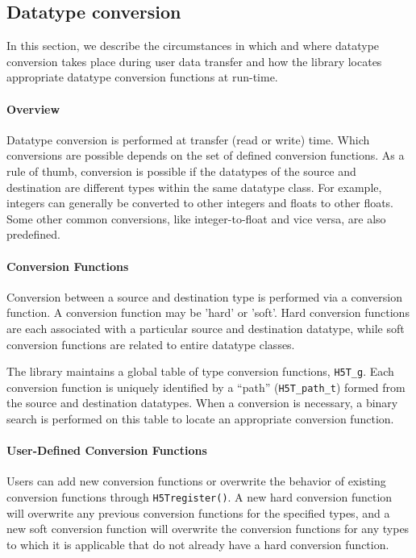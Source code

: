 \subsection{Datatype conversion}\label{sec:dtype-conv}

In this section, we describe the circumstances in which and where datatype conversion takes place during user data transfer and how the library locates appropriate datatype conversion functions at run-time.

\paragraph{Overview} Datatype conversion is performed at transfer (read or write) time. Which conversions are possible depends on the set of defined conversion functions. As a rule of thumb, conversion is possible if the datatypes of the source and destination are different types within the same datatype class. For example, integers can generally be converted to other integers and floats to other floats. Some other common conversions, like integer-to-float and vice versa, are also predefined.

\paragraph{Conversion Functions} Conversion between a source and destination type is performed via a conversion function. A conversion function may be 'hard' or 'soft'. Hard conversion functions are each associated with a particular source and destination datatype, while soft conversion functions are related to entire datatype classes. 

The library maintains a global table of type conversion functions, \texttt{H5T\_g}. Each conversion function is uniquely identified by a ``path'' (\texttt{H5T\_path\_t}) formed from the source and destination datatypes. When a conversion is necessary, a binary search is performed on this table to locate an appropriate conversion function. 

\paragraph{User-Defined Conversion Functions} Users can add new conversion functions or overwrite the behavior of existing conversion functions through \texttt{H5Tregister()}. A new hard conversion function will overwrite any previous conversion functions for the specified types, and a new soft conversion function will overwrite the conversion functions for any types to which it is applicable that do not already have a hard conversion function.

